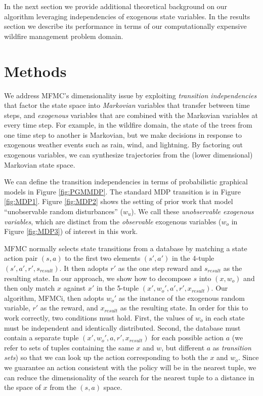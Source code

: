 \documentclass{article}
\newcommand{\algname}{MFMCi}
\begin{document}
In the next section we provide additional theoretical background on our
algorithm leveraging independencies of exogenous state variables.
In the results section we describe its performance in terms of our
computationally expensive wildfire management problem domain.

\section{Methods}

We address MFMC's dimensionality issue by exploiting \emph{transition independencies}
that factor the state space into \emph{Markovian} variables that transfer between time steps,
and \emph{exogenous} variables that are combined with the Markovian variables at every time step.
For example, in the wildfire domain, the state of the trees from one time step to another
is Markovian, but we make decisions in response to exogenous weather events such as rain, wind, and lightning.
By factoring out exogenous variables, we can synthesize trajectories
from the (lower dimensional) Markovian state space.

We can define the transition independencies in terms of
probabilistic graphical models in Figure \ref{fig:PGMMDP}.
The standard MDP transition is in Figure \ref{fig:MDP1}. Figure \ref{fig:MDP2} shows
the setting of prior work \cite{Fonteneau2010c,Hallak2015}
that model ``unobservable random disturbances'' ($w_u$).
We call these \emph{unobservable exogenous variables},
which are distinct from the \emph{observable} exogenous variables
($w_o$ in Figure \ref{fig:MDP3})
of interest in this work.

MFMC normally selects state transitions from a database by
matching a state action pair $(s,a)$
to the first two elements $(s',a')$ in the 4-tuple
$(s',a',r',s_{result})$.
It then adopts $r'$ as the one step reward and $s_{result}$
as the resulting state. In our approach, we show how to
decompose $s$ into $(x,w_o)$ and then only match $x$ against $x'$
in the 5-tuple $(x',w_{o}',a',r',x_{result})$.
Our algorithm, \algname, then adopts $w_{o}'$ as the instance of
the exogenous random variable, $r'$ as the reward, and $x_{result}$
as the resulting state. In order for this to work correctly,
two conditions must hold. First, the values of $w_o$ in each state must be
independent and identically distributed.
Second, the database must contain a separate tuple
$(x',w_{o}',a,r',x_{result})$ for each possible action $a$ (we refer to sets of tuples containing
the same $x$ and $w$, but different $a$ as \emph{transition sets}) so
that we can look up the action 
corresponding to both the $x$ and $w_o$.
Since we guarantee an action consistent with the policy will be in the nearest
tuple, we can reduce the dimensionality
of the search for the nearest tuple to a distance in the space of $x$ from the $(s,a)$ space.
\end{document}
